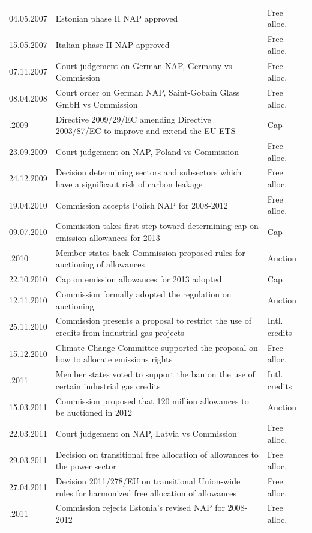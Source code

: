 \documentclass[
]{article}
\begin{document}
\begin{longtable}[l]{l>{\raggedright\arraybackslash}p{35em}l}
04.05.2007 & Estonian phase II NAP approved & Free alloc.\\
15.05.2007 & Italian phase II NAP approved & Free alloc.\\
07.11.2007 & Court judgement on German NAP, Germany vs Commission & Free alloc.\\
08.04.2008 & Court order on German NAP, Saint-Gobain Glass GmbH vs Commission & Free alloc.\\
\addlinespace
23.04.2009 & Directive 2009/29/EC amending Directive 2003/87/EC to improve and extend the EU ETS & Cap\\
23.09.2009 & Court judgement on NAP, Poland vs Commission & Free alloc.\\
24.12.2009 & Decision determining sectors and subsectors which have a significant risk of carbon leakage & Free alloc.\\
19.04.2010 & Commission accepts Polish NAP for 2008-2012 & Free alloc.\\
09.07.2010 & Commission takes first step toward determining cap on emission allowances for 2013 & Cap\\
\addlinespace
14.07.2010 & Member states back Commission proposed rules for auctioning of allowances & Auction\\
22.10.2010 & Cap on emission allowances for 2013 adopted & Cap\\
12.11.2010 & Commission formally adopted the regulation on auctioning & Auction\\
25.11.2010 & Commission presents a proposal to restrict the use of credits from industrial gas projects & Intl. credits\\
15.12.2010 & Climate Change Committee supported the proposal on how to allocate emissions rights & Free alloc.\\
\addlinespace
21.01.2011 & Member states voted to support the ban on the use of certain industrial gas credits & Intl. credits\\
15.03.2011 & Commission proposed that 120 million allowances to be auctioned in 2012 & Auction\\
22.03.2011 & Court judgement on NAP, Latvia vs Commission & Free alloc.\\
29.03.2011 & Decision on transitional free allocation of allowances to the power sector & Free alloc.\\
27.04.2011 & Decision 2011/278/EU on transitional Union-wide rules for harmonized free allocation of allowances & Free alloc.\\
\addlinespace
29.04.2011 & Commission rejects Estonia’s revised NAP for 2008-2012 & Free alloc.\\

\end{longtable}
\end{document}
